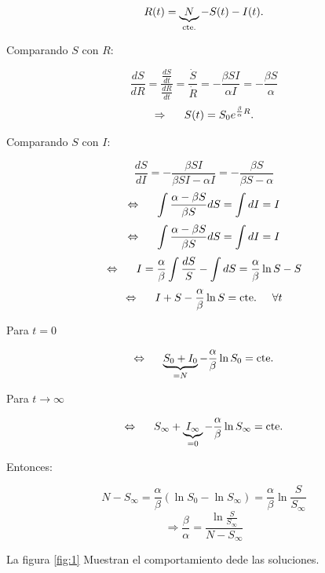 \documentclass[10pt,oneside]{article}
\begin{document}
\begin{multicols}{2}
     \begin{equation}\label{eq:5}
         R(t)=\underbrace{N}_{\textnormal{cte.}}-S(t)-I(t).
     \end{equation}

     Comparando $S$ con $R$:

     $$\frac{dS}{dR}=\frac{\frac{dS}{dt}}{\frac{dR}{dt}}=\frac{\dot S}{\dot R}=-\frac{\beta SI}{\alpha I}=-\frac{\beta S}{\alpha}$$ $$\Rightarrow\hspace{0.5cm} S(t)=S_0 e^{\frac{\beta}{\alpha} R}.$$

     Comparando $S$ con $I$:

      $$\frac{dS}{dI}=-\frac{\beta SI}{\beta SI-\alpha I}=-\frac{\beta S}{\beta S-\alpha }$$
      $$\Leftrightarrow\hspace{0.5cm}\int \frac{\alpha-\beta S}{\beta S}dS=\int dI =I$$
      $$\Leftrightarrow\hspace{0.5cm}\int \frac{\alpha-\beta S}{\beta S}dS=\int dI =I$$
      $$\Leftrightarrow\hspace{0.5cm}I=\frac{\alpha}{\beta}\int\frac{dS}{S}-\int dS=\frac{\alpha}{\beta}\ln S-S$$
      $$\Leftrightarrow\hspace{0.5cm} I+S-\frac{\alpha}{\beta}\ln S=\textnormal{cte.} \hspace{0.5cm} \forall t$$

      Para $t=0$
      
      $$\Leftrightarrow\hspace{0.5cm} \underbrace{S_0+I_0}_{=N}-\frac{\alpha}{\beta}\ln S_0= \textnormal{cte.}$$

      Para $t\to \infty$

      $$\Leftrightarrow\hspace{0.5cm} S_{\infty}+\underbrace{I_{\infty}}_{=0}-\frac{\alpha}{\beta}\ln S_{\infty}= \textnormal{cte.}$$

      Entonces:

      $$N-S_{\infty}=\frac{\alpha}{\beta}(\ln S_0-\ln S_{\infty})=\frac{\alpha}{\beta}\ln \frac{S}{S_{\infty}} $$
      $$ \Rightarrow \frac{\beta}{\alpha}=\frac{\ln \frac{S}{S_{\infty}}}{N-S_{\infty}} $$

      La figura \ref{fig:1} Muestran el comportamiento dede las soluciones.
      

\end{multicols}
\end{document}
